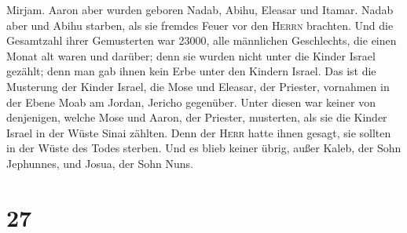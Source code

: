 Mirjam.  Aaron aber wurden geboren Nadab, Abihu, Eleasar
und Itamar.  Nadab aber und Abihu starben, als sie
fremdes Feuer vor den \textsc{Herrn} brachten.  Und die
Gesamtzahl ihrer Gemusterten war 23000, alle männlichen Geschlechts, die
einen Monat alt waren und darüber; denn sie wurden nicht unter die
Kinder Israel gezählt; denn man gab ihnen kein Erbe unter den Kindern
Israel.  Das ist die Musterung der Kinder Israel, die
Mose und Eleasar, der Priester, vornahmen in der Ebene Moab am Jordan,
Jericho gegenüber.  Unter diesen war keiner von
denjenigen, welche Mose und Aaron, der Priester, musterten, als sie die
Kinder Israel in der Wüste Sinai zählten.  Denn der
\textsc{Herr} hatte ihnen gesagt, sie sollten in der Wüste des Todes
sterben. Und es blieb keiner übrig, außer Kaleb, der Sohn Jephunnes, und
Josua, der Sohn Nuns.

\hypertarget{section-26}{%
\section{27}\label{section-26}}

